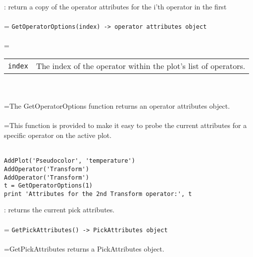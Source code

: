 \documentclass[10pt,a4paper]{report}
\begin{document}
{}
: return a copy of the operator attributes for the i'th operator in the first\\[-3mm]

 \\ 
\hangindent=\parindent 
\verb!GetOperatorOptions(index) -> operator attributes object!\\ [-3mm]

 \\ 
\hangindent=\parindent 
\begin{tabular}{lp{9cm}}
\verb!index! & The index of the operator within the plot's list of operators. \\
\end{tabular} \\[-2mm]


 \\ 
\hangindent=\parindent The GetOperatorOptions function returns an operator attributes object. \\[-3mm] 

 \\ 
\hangindent=\parindent This function is provided to make it easy to probe the current attributes for a specific operator on the active plot. \\[-3mm] 

\\[-6mm]
\begin{verbatim}AddPlot('Pseudocolor', 'temperature')
AddOperator('Transform')
AddOperator('Transform')
t = GetOperatorOptions(1)
print 'Attributes for the 2nd Transform operator:', t
\end{verbatim}
\newpage


{}
: returns the current pick attributes.\\[-3mm]

 \\ 
\hangindent=\parindent 
\verb!GetPickAttributes() -> PickAttributes object!\\ [-3mm]

 \\ 
\hangindent=\parindent GetPickAttributes returns a PickAttributes object. \\[-3mm] 
\end{document}
